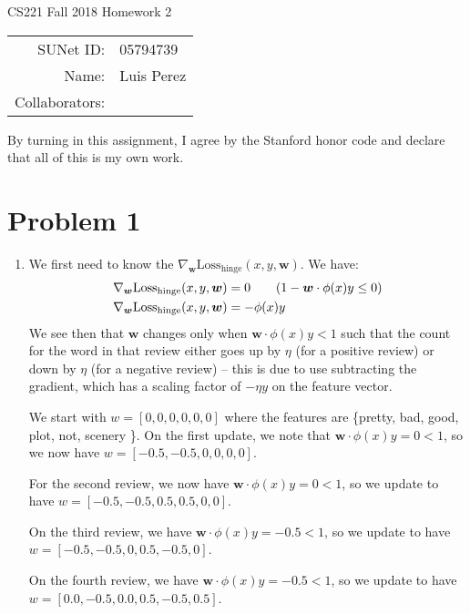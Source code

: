 \documentclass[12pt]{article}
\begin{document}
\begin{center}
{\Large CS221 Fall 2018 Homework 2}

\begin{tabular}{rl}
SUNet ID: & 05794739 \\
Name: & Luis Perez \\
Collaborators: &
\end{tabular}
\end{center}

By turning in this assignment, I agree by the Stanford honor code and declare
that all of this is my own work.

\section*{Problem 1}

\begin{enumerate}[label=(\alph*)]
  \item We first need to know the $\nabla_{\bm{w}}\text{Loss}_{\text{hinge}}(x, y, \bm{w})$. We have:
  \begin{align*}
    \nabla_{\bm{w}}\text{Loss}_{\text{hinge}}(x, y, \bm{w}) &= 0 \tag{$1 - \bm{w}\cdot\phi(x)y \leq 0$} \\
    \nabla_{\bm{w}}\text{Loss}_{\text{hinge}}(x, y, \bm{w}) &= - \phi(x)y
  \end{align*}
  We see then that $\bm{w}$ changes only when $\bm{w}\cdot\phi(x)y < 1$ such that the count for the word in that review either goes up by $\eta$ (for a positive review) or down by $\eta$ (for a negative review) -- this is due to use subtracting the gradient, which has a scaling factor of $-\eta y$ on the feature vector. 

  We start with $w = [0, 0, 0, 0, 0, 0]$ where the features are \{pretty, bad, good, plot, not, scenery \}. On the first update, we note that $\bm{w}\cdot\phi(x)y = 0 < 1$, so we now have $w = [ -0.5, -0.5, 0, 0, 0, 0]$.

  For the second review, we now have $\bm{w}\cdot\phi(x)y = 0 < 1$, so we update to have $w = [-0.5, -0.5, 0.5, 0.5, 0, 0]$.

  On the third review, we have $\bm{w}\cdot\phi(x)y = -0.5 < 1$, so we update to have $w = [-0.5, -0.5, 0, 0.5, -0.5, 0]$.

  On the fourth review, we have $\bm{w}\cdot\phi(x)y = -0.5 < 1$, so we update to have $w = [0.0, -0.5, 0.0, 0.5, -0.5, 0.5]$.


\end{enumerate}
\end{document}
